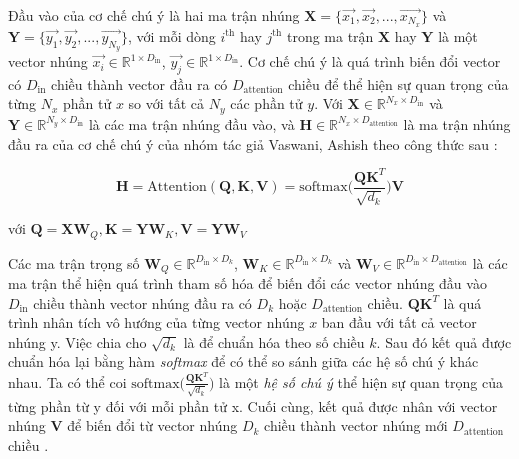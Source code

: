 Đầu vào của cơ chế chú ý là hai ma trận nhúng $\mathbf{X} = \Big\{\overrightarrow{x_1}, \overrightarrow{x_2}, ...,  \overrightarrow{x_{N_x}}\Big\}$ và $\mathbf{Y} = \Big\{\overrightarrow{y_1}, \overrightarrow{y_2}, ...,  \overrightarrow{y_{N_y}}\Big\}$, với mỗi dòng $i^{\text{th}}$ hay $j^{\text{th}}$ trong ma trận $\mathbf{X}$ hay $\mathbf{Y}$ là một vector nhúng $\overrightarrow{x_i} \in \mathbb{R}^{1 \times D_{\text{in}}}$, $\overrightarrow{y_j} \in \mathbb{R}^{1 \times D_{\text{in}}}$.
Cơ chế chú ý là quá trình biến đổi vector có $D_{\text{in}}$ chiều thành vector đầu ra có $D_{\text{attention}}$ chiều để thể hiện sự quan trọng của từng $N_x$ phần tử $x$ so với tất cả $N_y$ các phần tử $y$. Với $\mathbf{X} \in \mathbb{R}^{N_x \times D_\text{in}}$ và $\mathbf{Y} \in \mathbb{R}^{N_y \times D_\text{in}}$ là các ma trận nhúng đầu vào, và $\mathbf{H} \in \mathbb{R}^{N_x \times D_\text{attention}}$ là ma trận nhúng đầu ra của cơ chế chú ý của nhóm tác giả Vaswani, Ashish\cite{vaswani2017attention} theo công thức sau :

\begin{equation}
	\label{attention}
	\mathbf{H} = \text{Attention}(\mathbf{Q}, \mathbf{K}, \mathbf{V}) = \text{softmax}\Big(\frac{\mathbf{Q}\mathbf{K}^T}{\sqrt{d_k}}\Big) \mathbf{V}
\end{equation}

với  $\mathbf{Q} = \mathbf{X}\mathbf{W}_Q, \mathbf{K} = \mathbf{Y} \mathbf{W}_K, \mathbf{V} = \mathbf{Y} \mathbf{W}_V$

Các ma trận trọng số 
$\mathbf{W}_Q \in \mathbb{R}^{D_{\text{in}} \times D_{k}}$, 
$\mathbf{W}_K \in \mathbb{R}^{D_{\text{in}} \times D_{k}}$ và 
$\mathbf{W}_V \in \mathbb{R}^{D_{\text{in}} \times D_{\text{attention}}}$ là các ma trận thể hiện quá trình tham số hóa để biến đổi các vector nhúng đầu vào $D_{\text{in}}$ chiều thành vector nhúng đầu ra có $D_{k}$ hoặc $D_{\text{attention}}$ chiều. $\mathbf{Q}\mathbf{K}^T$ là quá trình nhân tích vô hướng của từng vector nhúng $x$ ban đầu với tất cả vector nhúng y. Việc chia cho $\sqrt{d_k}$ là để chuẩn hóa theo số chiều $k$. Sau đó kết quả được chuẩn hóa lại bằng hàm \textit{softmax} để có thể so sánh giữa các hệ số chú ý khác nhau. Ta có thể coi $\text{softmax}\Big(\frac{\mathbf{Q}\mathbf{K}^T}{\sqrt{d_k}}\Big)$ là một \textit{hệ số chú ý} thể hiện sự quan trọng của từng phần từ y đối với mỗi phần tử x. Cuối cùng, kết quả được nhân với vector nhúng $\mathbf{V}$ để biến đổi từ vector nhúng $D_{k}$ chiều thành vector nhúng mới  $D_{\text{attention}}$ chiều .

